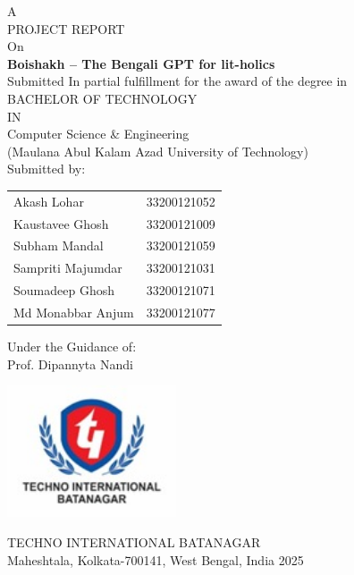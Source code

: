 \begin{titlepage}
    \begin{center}
        \vspace*{0.5cm}
        
        
        \vspace{0.5cm}
        {\large A}\\[0.3cm]
        {\large PROJECT REPORT}\\[0.3cm]
        {\large On}\\[0.5cm]
        
        {\LARGE\textbf{Boishakh -- The Bengali GPT for lit-holics}}\\[1cm]
        
        {\large Submitted In partial fulfillment for the award of the degree in}\\[0.7cm]
        
        {\Large BACHELOR OF TECHNOLOGY}\\[0.3cm]
        {\large IN}\\[0.3cm]
        {\large Computer Science \& Engineering}\\[0.3cm]
        
        {\large (Maulana Abul Kalam Azad University of Technology)}\\[1cm]
        
        {\large Submitted by:}\\[0.5cm]

        \begin{tabular}{ll}
            Akash Lohar & 33200121052\\
            Kaustavee Ghosh & 33200121009\\
            Subham Mandal & 33200121059\\
            Sampriti Majumdar & 33200121031\\
            Soumadeep Ghosh & 33200121071\\
            Md Monabbar Anjum & 33200121077
        \end{tabular}
        
        \vfill
        
        {\large Under the Guidance of:}\\[0.3cm]
        {\large Prof. Dipannyta Nandi}

        \includegraphics[width=5cm]{university-logo.jpeg}

        {\Large TECHNO INTERNATIONAL BATANAGAR}\\[0.3cm]
        {\large Maheshtala, Kolkata-700141, West Bengal, India 2025}\\[1cm]
        
    \end{center}
\end{titlepage}